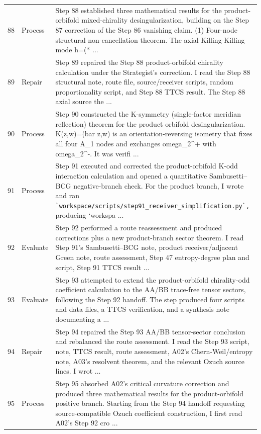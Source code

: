 \documentclass[UTF8,fontset=fandol,zihao=-4]{ctexart}
\begin{document}
\begin{longtable}{r p{} >{\raggedright\arraybackslash}p{}}
88 & Process & Step 88 established three mathematical results for the product-orbifold mixed-chirality desingularization, building on the Step 87 correction of the Step 86 vanishing claim. (1) Four-node structural non-cancellation theorem. The axial Killing-Killing mode h=(* ...\\
89 & Repair & Step 89 repaired the Step 88 product-orbifold chirality calculation under the Strategist's correction. I read the Step 88 structural note, route file, source/receiver scripts, random proportionality script, and Step 88 TTCS result. The Step 88 axial source the ...\\
90 & Process & Step 90 constructed the K-symmetry (single-factor meridian reflection) theorem for the product orbifold desingularization. K(z,w)=(bar z,w) is an orientation-reversing isometry that fixes all four A\_1 nodes and exchanges omega\_2\textasciicircum{}+ with omega\_2\textasciicircum{}-. It was verifi ...\\
91 & Process & Step 91 executed and corrected the product-orbifold K-odd interaction calculation and opened a quantitative Sambusetti--BCG negative-branch check. For the product branch, I wrote and ran \nolinkurl{`workspace/scripts/step91_receiver_simplification.py`,} producing `workspa ...\\
92 & Evaluate & Step 92 performed a route reassessment and produced corrections plus a new product-branch sector theorem. I read Step 91's Sambusetti--BCG note, product receiver/adjacent Green note, route assessment, Step 47 entropy-degree plan and script, Step 91 TTCS result ...\\
93 & Evaluate & Step 93 attempted to extend the product-orbifold chirality-odd coefficient calculation to the AA/BB trace-free tensor sectors, following the Step 92 handoff. The step produced four scripts and data files, a TTCS verification, and a synthesis note documenting a ...\\
94 & Repair & Step 94 repaired the Step 93 AA/BB tensor-sector conclusion and rebalanced the route assessment. I read the Step 93 script, note, TTCS result, route assessment, A02's Chern-Weil/entropy note, A03's resolvent theorem, and the relevant Ozuch source lines. I wrot ...\\
95 & Process & Step 95 absorbed A02's critical curvature correction and produced three mathematical results for the product-orbifold positive branch. Starting from the Step 94 handoff requesting source-compatible Ozuch coefficient construction, I first read A02's Step 92 cro ...\\

\end{longtable}
\end{document}
